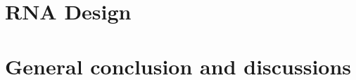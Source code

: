 \documentclass[ twoside,openright,titlepage,numbers=noenddot,%
                headinclude,footinclude,cleardoublepage=empty,abstract=on,
                BCOR=5mm,paper=a4,fontsize=12pt,dvipsnames
                ]{scrreprt}
\begin{document}
\part{RNA Design}


\part{General conclusion and discussions }\label{discusion}

\appendix
\cleardoublepage

\cleardoublepage
\cleardoublepage
\cleardoublepage
\end{document}
